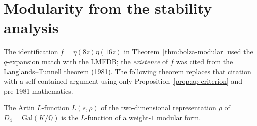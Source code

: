 \section{Modularity from the stability analysis}

The identification $f = \eta(8z)\eta(16z)$ in
Theorem~\ref{thm:bolza-modular} used the $q$-expansion match
with the LMFDB; the \emph{existence} of $f$ was cited from
the Langlands--Tunnell theorem (1981).
The following theorem replaces that citation with a
self-contained argument using only
Proposition~\ref{prop:ap-criterion} and pre-1981 mathematics.

\begin{theorem}
\label{thm:modularity-from-stability}
The Artin $L$-function $L(s, \rho)$ of the two-dimensional
representation $\rho$ of $D_4 = \mathrm{Gal}(K/\mathbb{Q})$
is the $L$-function of a weight-$1$ modular form.
\end{theorem}

